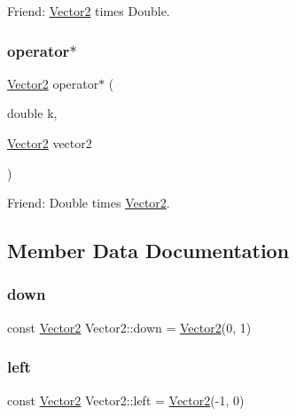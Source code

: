 Friend\+: \mbox{\hyperlink{struct_vector2}{Vector2}} times Double. 

\mbox{\label{struct_vector2_a6ac6360b23e2a1457b794f0aefc18f3a}} 
\subsubsection{\texorpdfstring{operator$\ast$}{operator*}\hspace{0.1cm}{\footnotesize\ttfamily [2/2]}}
{\footnotesize\ttfamily \mbox{\hyperlink{struct_vector2}{Vector2}} operator$\ast$ (\begin{DoxyParamCaption}\item[{double}]{k,  }\item[{\mbox{\hyperlink{struct_vector2}{Vector2}}}]{vector2 }\end{DoxyParamCaption})\hspace{0.3cm}{\ttfamily [friend]}}



Friend\+: Double times \mbox{\hyperlink{struct_vector2}{Vector2}}. 



\subsection{Member Data Documentation}
\mbox{\label{struct_vector2_a64cb9ddeb42abbcfa527c3e2660ffef9}} 
\subsubsection{\texorpdfstring{down}{down}}
{\footnotesize\ttfamily const \mbox{\hyperlink{struct_vector2}{Vector2}} Vector2\+::down = \mbox{\hyperlink{struct_vector2}{Vector2}}(0, 1)\hspace{0.3cm}{\ttfamily [static]}}

\mbox{\label{struct_vector2_aaad26bbee0364de1e6a8676215886a2f}} 
\subsubsection{\texorpdfstring{left}{left}}
{\footnotesize\ttfamily const \mbox{\hyperlink{struct_vector2}{Vector2}} Vector2\+::left = \mbox{\hyperlink{struct_vector2}{Vector2}}(-\/1, 0)\hspace{0.3cm}{\ttfamily [static]}}

